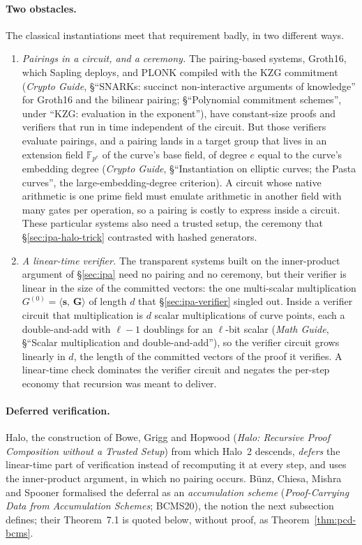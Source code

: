 \documentclass[11pt,a4paper]{article}
\theoremstyle{definition}
\newcommand{\F}{\mathbb{F}}
\newcommand{\ip}[2]{\langle #1,\, #2 \rangle}
\begin{document}
\paragraph{Two obstacles.}
The classical instantiations meet that requirement badly, in two
different ways.
\begin{enumerate}[leftmargin=*, itemsep=2pt]
\item \emph{Pairings in a circuit, and a ceremony.} The pairing-based
  systems, Groth16, which Sapling deploys, and PLONK compiled with the
  KZG commitment (\emph{Crypto Guide}, \S``SNARKs: succinct
  non-interactive arguments of knowledge'' for Groth16 and the bilinear
  pairing; \S``Polynomial commitment schemes'', under ``KZG: evaluation
  in the exponent''), have constant-size proofs and verifiers that run
  in time independent of the circuit. But those verifiers evaluate
  pairings, and a pairing lands in a target group that lives in an
  extension field $\F_{p^{e}}$ of the curve's base field, of degree $e$
  equal to the curve's embedding degree (\emph{Crypto Guide},
  \S``Instantiation on elliptic curves; the Pasta curves'', the
  large-embedding-degree criterion). A circuit whose native arithmetic
  is one prime field must emulate arithmetic in another field with
  many gates per operation, so a pairing is costly to express inside a
  circuit. These particular systems also need a trusted setup, the
  ceremony that \S\ref{sec:ipa-halo-trick} contrasted with hashed
  generators.
\item \emph{A linear-time verifier.} The transparent systems built on
  the inner-product argument of \S\ref{sec:ipa} need no pairing and no
  ceremony, but their verifier is linear in the size of the committed
  vectors: the one multi-scalar multiplication $G^{(0)} =
  \ip{\mathbf s}{\mathbf G}$ of length $d$ that \S\ref{sec:ipa-verifier}
  singled out. Inside a verifier circuit that multiplication is $d$
  scalar multiplications of curve points, each a double-and-add with
  $\ell - 1$ doublings for an $\ell$-bit scalar (\emph{Math Guide},
  \S``Scalar multiplication and double-and-add''), so the verifier
  circuit grows linearly in $d$, the length of the committed vectors of
  the proof it verifies. A linear-time check dominates the verifier circuit and
  negates the per-step economy that recursion was meant to deliver.
\end{enumerate}

\paragraph{Deferred verification.}
Halo, the construction of Bowe, Grigg and Hopwood (\emph{Halo: Recursive
Proof Composition without a Trusted Setup}) from which Halo~2 descends,
\emph{defers} the linear-time part of verification instead of
recomputing it at every step, and uses the inner-product argument, in
which no pairing occurs. B\"unz, Chiesa, Mishra and Spooner formalised
the deferral as an \emph{accumulation scheme} (\emph{Proof-Carrying Data
from Accumulation Schemes}; BCMS20), the notion the next subsection
defines; their Theorem~7.1 is quoted below, without proof, as
Theorem~\ref{thm:pcd-bcms}.
\end{document}
